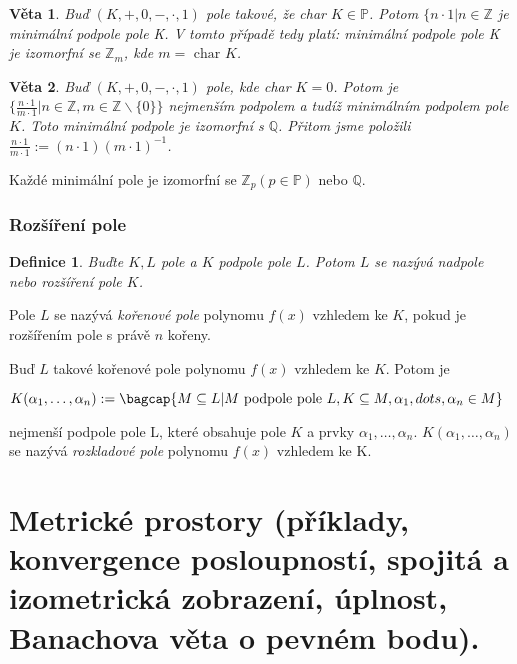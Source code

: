 \documentclass[a4paper, 11pt]{report}
\newtheorem{mydef}{Definice}[chapter]
\newtheorem{veta}{Věta}
\begin{document}
\begin{veta}
Buď $(K, +, 0, -, \cdot, 1)$ pole takové, že char $K \in \mathbb{P}$. Potom $\{n \cdot 1 | n \in \mathbb{Z}$ je minimální podpole pole K. V tomto případě tedy platí: minimální podpole pole K je izomorfní se $\mathbb{Z}_m$, kde $m = \text{ char } K$.
\end{veta}

\begin{veta}
Buď $(K, +, 0, -, \cdot, 1)$ pole, kde char $K = 0$. Potom je $\{ \frac{n \cdot 1}{m \cdot 1} | n \in \mathbb{Z}, m \in \mathbb{Z} \backslash \{0\}\}$ nejmenším podpolem  a tudíž minimálním podpolem pole $K$. Toto minimální podpole je izomorfní s $\mathbb{Q}$. Přitom jsme položili $\frac{n \cdot 1}{m \cdot 1} := (n \cdot 1)(m \cdot 1)^{-1}$.
\end{veta}

Každé minimální pole je izomorfní se $\mathbb{Z}_p (p \in \mathbb{P})$ nebo $\mathbb{Q}$.

\subsection{Rozšíření pole}
\begin{mydef}
Buďte $K, L$ pole a $K$ podpole pole $L$. Potom $L$ se nazývá nadpole nebo rozšíření pole $K$.
\end{mydef}

Pole $L$ se nazývá \emph{kořenové pole} polynomu $f(x)$ vzhledem ke $K$, pokud je rozšířením pole s právě $n$ kořeny.

Buď $L$ takové kořenové pole polynomu $f(x)$ vzhledem ke $K$. Potom je

$K(\alpha_1, \dots, \alpha_n) := \bagcap \{M \subseteq L | M \text{ podpole pole } L, K \subseteq M, \alpha_1, dots, \alpha_n \in M \}$

nejmenší podpole pole L, které obsahuje pole $K$ a prvky $\alpha_1, \dots, \alpha_n$. $K(\alpha_1, \dots, \alpha_n)$ se nazývá \emph{rozkladové pole} polynomu $f(x)$ vzhledem ke K.













\chapter{Metrické prostory (příklady, konvergence posloupností, spojitá a izometrická zobrazení, úplnost, Banachova věta o pevném bodu).} \label{cha:12}
\end{document}
